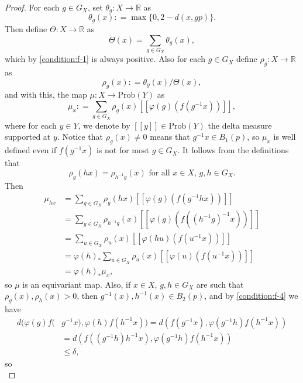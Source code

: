 \documentclass[12pt]{amsart}
\theoremstyle{definition}
\numberwithin{equation}{section}
\newcommand{\prob}{\text{Prob}}
\begin{document}
\begin{proof}
    For each $g \in G_X$, set $\theta _g : X \to \mathbb{R}$ as 
    \[   \theta_g(x) : = \max \{ 0, 2 - d(x, gp) \}.           \]
    Then define $\Theta : X \to \mathbb{R}$ as 
    \[\Theta (x) = \sum_{g \in G_X} \theta_g (x), \]
    which by \eqref{condition:f-1} is always positive.  Also for each $g \in G_X$ define $\rho _g : X \to \mathbb{R}$ as 
    \[   \rho _g (x)  : = \theta _g (x) / \Theta (x),  \]
    and with this, the map $\mu : X \to \prob (Y)$ as
    \[    \mu _x : = \sum_{g \in G_X} \rho _g (x) [[  \varphi (g) ( f ( g^{-1} x ) ) ]],          \]
    where for each $y \in Y$, we denote by $[[y]] \in \prob (Y)$ the delta measure supported at $y$.  Notice that $\rho_g (x) \neq 0$ means that $g^{-1}x \in B_1(p)$, so $\mu _x$ is well defined even if $f(g^{-1}x)$ is not for most $g \in G_X$. It follows from the definitions that  
    \[  \rho _g (hx) = \rho_{h^{-1}g} (x)  \text{  for all }x \in X,\,  g,h \in G_X. \]
    Then 
    \begin{equation}\label{eq:mu-equivariant}
        \begin{split}
    \mu _{hx}  &  =   \sum_{g \in G_X} \rho _g (hx) [[  \varphi (g) ( f ( g^{-1}h x ) ) ]]  \\
    &   =   \sum_{g \in G_X} \rho _{h^{-1 }g} ( x) [[  \varphi (g) ( f ( (h^{-1 }g)^{-1} x ) ) ]] \\
        &   =  \sum _{u \in G_X}  \rho _{ u } (x) [[  \varphi (h u ) (f (u ^{-1} x)  ) ]] \\
        & = \varphi ( h) _{\ast} \sum _{u \in G_X}  \rho _{ u } (x) [[  \varphi ( u ) (f (u ^{-1} x)  ) ]] \\
        & = \varphi (h ) _{\ast} \mu _x ,             
        \end{split}
    \end{equation}
    so $\mu $ is an equivariant map. Also, if $x \in X$,  $g, h \in G_X$ are such that  $\rho _{g} (x), \rho _{h} (x) > 0 $, then $g^{-1}(x), h^{-1} (x) \in B_2(p)$, and by  \eqref{condition:f-4} we have
    \begin{align*}
         d( \varphi (g )  f(  &g^{-1} x ) ,  \varphi (h ) f(  h^{-1} x )  )    =   d (  f(  g^{-1} x ) ,  \varphi (g^{-1} h) f(  h^{-1} x ) ) \\
         & =  d (  f(  ( g^{-1} h  ) h ^{-1 } x ) ,  \varphi (g^{-1} h) f(  h^{-1} x ) ) \\
         & \leq \delta ,
    \end{align*}
    so 
    \begin{equation}\label{eq:diameter-supp-mu}

\end{equation}
\end{proof}
\end{document}
